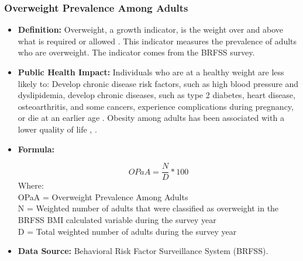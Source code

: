 \documentclass[12pt,letterpaper]{report}
\begin{document}
		\subsubsection{Overweight Prevalence Among Adults} 
	\begin{itemize}
		\item \textbf{Definition:}  Overweight, a growth indicator, is the weight over and above what is required or allowed \cite{merriam2004merriam}. This indicator measures the prevalence of adults who are overweight. The indicator comes from the BRFSS survey.
		
		\item \textbf{Public Health Impact:}  Individuals who are at a healthy weight are less likely to: Develop chronic disease risk factors, such as high blood pressure and dyslipidemia, develop chronic diseases, such as type 2 diabetes, heart disease, osteoarthritis, and some cancers, experience complications during pregnancy, or die at an earlier age \cite{wyatt2006overweight} \cite{williams2005health} \cite{kopelman2007health} \cite{van1985health}. Obesity among adults has been associated with a lower quality of life \cite{larsson2002impact}, \cite{jia2005impact}.
		\item \textbf{Formula:} 

			\begin{equation}
				OPaA = \frac{N}{D} *100
			\end{equation}
Where: \\
			OPaA = Overweight Prevalence Among Adults \\
			
			N = Weighted number of adults that were classified as overweight in the BRFSS BMI calculated variable during the survey year \\
			
			D = Total weighted number of adults during the survey year \\

		\item \textbf{Data Source:} Behavioral Risk Factor Surveillance System (BRFSS). 
	\end{itemize}
 
\end{document}
